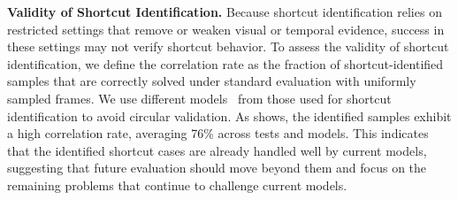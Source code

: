 \documentclass[runningheads]{llncs}
\begin{document}
{        \noindent\textbf{Validity of Shortcut Identification.} 
        Because shortcut identification relies on restricted settings that remove or weaken visual or temporal evidence, success in these settings may not verify shortcut behavior.
        To assess the validity of shortcut identification, we define the correlation rate as the fraction of shortcut-identified samples that are correctly solved under standard evaluation with uniformly sampled frames.
        We use different models~\cite{internvl35,longvilar1,videotool} from those used for shortcut identification to avoid circular validation.
        As  shows, the identified samples exhibit a high correlation rate, averaging 76\% across tests and models.
        This indicates that the identified shortcut cases are already handled well by current models, suggesting that future evaluation should move beyond them and focus on the remaining problems that continue to challenge current models.
        \vspace{-2mm}

        \begin{table}[ht]
        \vspace{-4mm}
        \centering
        \caption{Correlation rate (\%) of shortcut-identified samples under standard evaluation.}
        \label{tab:main6}
        \small
        \setlength{\tabcolsep}{4pt}
             \vspace{-4mm}
        \end{table}
}
\end{document}
